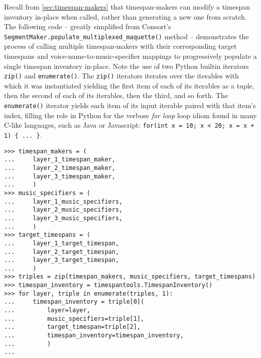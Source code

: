 \noindent Recall from \autoref{sec:timespan-makers} that timespan-makers can
modify a timespan inventory in-place when called, rather than generating a new
one from scratch. The following code -- greatly simplified from Consort's
\texttt{SegmentMaker.populate\_multiplexed\_maquette()} method -- demonstrates
the process of calling multiple timespan-makers with their corresponding target
timespans and voice-name-to-music-specifier mappings to progressively populate
a single timespan inventory in-place. Note the use of two Python builtin
iterators \texttt{zip()} and \texttt{enumerate()}. The \texttt{zip()} iterators
iterates over the iterables with which it was instantiated yielding the first
item of each of its iterables as a tuple, then the second of each of its
iterables, then the third, and so forth. The \texttt{enumerate()} iterator
yields each item of its input iterable paired with that item's index, filling
the role in Python for the verbose \emph{for loop} loop idiom found in many
C-like languages, such as Java or Javascript: \texttt{for(int x = 10; x < 20; x
= x + 1) \{ ... \}}.

\begin{comment}
<abjad>
timespan_makers = (
    layer_1_timespan_maker,
    layer_2_timespan_maker,
    layer_3_timespan_maker,
    )
music_specifiers = (
    layer_1_music_specifiers,
    layer_2_music_specifiers,
    layer_3_music_specifiers,
    )
target_timespans = (
    layer_1_target_timespan,
    layer_2_target_timespan,
    layer_3_target_timespan,
    )
triples = zip(timespan_makers, music_specifiers, target_timespans)
timespan_inventory = timespantools.TimespanInventory()
for layer, triple in enumerate(triples, 1):
    timespan_inventory = triple[0](
        layer=layer,
        music_specifiers=triple[1],
        target_timespan=triple[2],
        timespan_inventory=timespan_inventory,
        )

</abjad>
\end{comment}

\begin{abjadbookoutput}
\begin{singlespacing}
\vspace{-0.5\baselineskip}
\begin{lstlisting}
>>> timespan_makers = (
...     layer_1_timespan_maker,
...     layer_2_timespan_maker,
...     layer_3_timespan_maker,
...     )
>>> music_specifiers = (
...     layer_1_music_specifiers,
...     layer_2_music_specifiers,
...     layer_3_music_specifiers,
...     )
>>> target_timespans = (
...     layer_1_target_timespan,
...     layer_2_target_timespan,
...     layer_3_target_timespan,
...     )
>>> triples = zip(timespan_makers, music_specifiers, target_timespans)
>>> timespan_inventory = timespantools.TimespanInventory()
>>> for layer, triple in enumerate(triples, 1):
...     timespan_inventory = triple[0](
...         layer=layer,
...         music_specifiers=triple[1],
...         target_timespan=triple[2],
...         timespan_inventory=timespan_inventory,
...         )
...
\end{lstlisting}
\end{singlespacing}
\end{abjadbookoutput}

